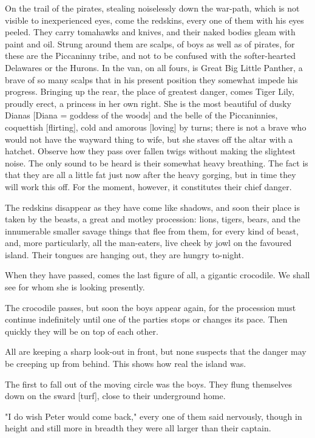 On the trail of the pirates, stealing noiselessly down the war-path, which
is not visible to inexperienced eyes, come the redskins, every one of them
with his eyes peeled. They carry tomahawks and knives, and their naked
bodies gleam with paint and oil. Strung around them are scalps, of boys as
well as of pirates, for these are the Piccaninny tribe, and not to be
confused with the softer-hearted Delawares or the Hurons. In the van, on
all fours, is Great Big Little Panther, a brave of so many scalps that in
his present position they somewhat impede his progress. Bringing up the
rear, the place of greatest danger, comes Tiger Lily, proudly erect, a
princess in her own right. She is the most beautiful of dusky Dianas
[Diana = goddess of the woods] and the belle of the Piccaninnies,
coquettish [flirting], cold and amorous [loving] by turns; there is not a
brave who would not have the wayward thing to wife, but she staves off the
altar with a hatchet. Observe how they pass over fallen twigs without
making the slightest noise. The only sound to be heard is their somewhat
heavy breathing. The fact is that they are all a little fat just now after
the heavy gorging, but in time they will work this off. For the moment,
however, it constitutes their chief danger.


The redskins disappear as they have come like shadows, and soon their
place is taken by the beasts, a great and motley procession: lions,
tigers, bears, and the innumerable smaller savage things that flee from
them, for every kind of beast, and, more particularly, all the man-eaters,
live cheek by jowl on the favoured island. Their tongues are hanging out,
they are hungry to-night.


When they have passed, comes the last figure of all, a gigantic crocodile.
We shall see for whom she is looking presently.


The crocodile passes, but soon the boys appear again, for the procession
must continue indefinitely until one of the parties stops or changes its
pace. Then quickly they will be on top of each other.


All are keeping a sharp look-out in front, but none suspects that the
danger may be creeping up from behind. This shows how real the island was.


The first to fall out of the moving circle was the boys. They flung
themselves down on the sward [turf], close to their underground home.


"I do wish Peter would come back," every one of them said nervously,
though in height and still more in breadth they were all larger than their
captain.


